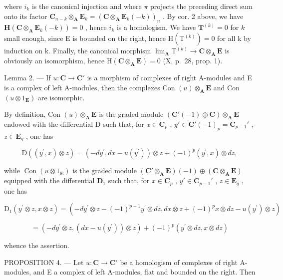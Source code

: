 where \(i_{k}\) is the canonical injection and where \(\pi\) projects the preceding direct sum onto its factor \(\mathbf{C}_{n-k} \otimes_{\mathbf{A}} \mathbf{E}_{k} = (\mathbf{C} \otimes_{\mathbf{A}} \mathbf{E}_{k}(-k))_{n}\) . By cor. 2 above, we have \(\mathbf{H}(\mathbf{C} \otimes_{\mathbf{A}} \mathbf{E}_{k}(-k)) = 0\) , hence \(i_{k}\) is a homologism. We have \(\mathbf{T}^{(k)} = 0\) for \(k\) small enough, since E is bounded on the right, hence \(\mathrm{H}(\mathrm{T}^{(k)}) = 0\) for all k by induction on k. Finally, the canonical morphism \(\lim_{\mathbf{A}} \mathrm{T}^{(k)} \to \mathbf{C} \otimes_{\mathbf{A}} \mathbf{E}\) is obviously an isomorphism, hence \(\mathrm{H}(\mathbf{C} \otimes_{\mathbf{A}} \mathbf{E}) = 0\) (X, p.~28, prop. 1).

Lemma 2. --- If \(u: \mathbf{C} \to \mathbf{C}'\) is a morphism of complexes of right A-modules and E is a complex of left A-modules, then the complexes Con \((u) \otimes_{\mathbf{A}} \mathbf{E}\) and Con \((u \otimes 1_{\mathbf{E}})\) are isomorphic.

By definition, Con \((u) \otimes_{\mathbf{A}} \mathbf{E}\) is the graded module \((\mathbf{C}'(-1) \oplus \mathbf{C}) \otimes_{\mathbf{A}} \mathbf{E}\) endowed with the differential D such that, for \(x \in \mathbf{C}_p\) , \(y' \in \mathbf{C}'(-1)_p = \mathbf{C}_{p-1}'\) , \(z \in \mathbf{E}_q\) , one has

\[
\mathrm{D} ((y ^ {\prime}, x) \otimes z) = (- d y ^ {\prime}, d x - u (y ^ {\prime})) \otimes z + (- 1) ^ {p} (y ^ {\prime}, x) \otimes d z,\tag{4}
\]

while \(\operatorname{Con}(u \otimes 1_{\mathbf{E}})\) is the graded module \((\mathbf{C}' \otimes_{\mathbf{A}} \mathbf{E})(-1) \oplus (\mathbf{C} \otimes_{\mathbf{A}} \mathbf{E})\) equipped with the differential \(\mathbf{D}_1\) such that, for \(x \in \mathbf{C}_p\) , \(y' \in \mathbf{C}_{p-1}'\) , \(z \in \mathbf{E}_q\) , one has

\[
\mathrm{D} _ {1} \left(y ^ {\prime} \otimes z, x \otimes z\right) = (- d y ^ {\prime} \otimes z - (- 1) ^ {p - 1} y ^ {\prime} \otimes d z, d x \otimes z + (- 1) ^ {p} x \otimes d z - u \left(y ^ {\prime}\right) \otimes z)
\]

\[
= \left(- d y ^ {\prime} \otimes z, (d x - u (y ^ {\prime})) \otimes z\right) + (- 1) ^ {p} \left(y ^ {\prime} \otimes d z, x \otimes d z\right)
\]

whence the assertion.

PROPOSITION 4. — Let \(u: \mathbf{C} \to \mathbf{C}'\) be a homologism of complexes of right A-modules, and E a complex of left A-modules, flat and bounded on the right. Then

